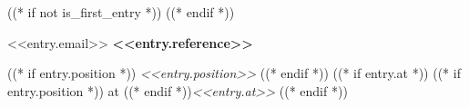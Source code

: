 ((* if not is_first_entry *))
\vspace{<<design.margins.entry_area.vertical_between>>}
((* endif *))

\begin{samepage}
    \begin{twocolentry}{<<entry.email>>}
        \textbf{<<entry.reference>>}

        \vspace{<<design.margins.highlights_area.top>>}

        ((* if entry.position *))
        \textit{<<entry.position>>}
        ((* endif *))
        ((* if entry.at *))
        ((* if entry.position *)) at ((* endif *))\textit{<<entry.at>>}
        ((* endif *))
    \end{twocolentry}
\end{samepage}
